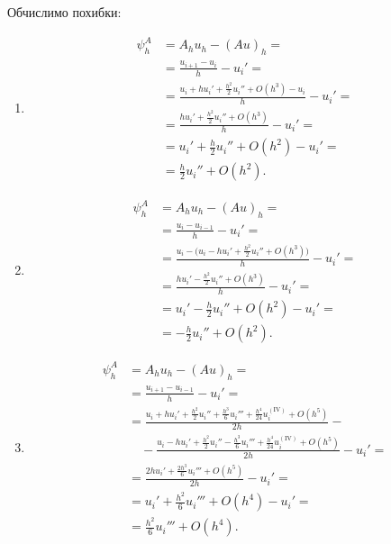 \begin{solution}
    Обчислимо похибки:
    \begin{enumerate}
        \item
        \begin{equation*}
            \begin{aligned}
                \psi_h^A &= A_h u_h - (A u)_h = \\
                &= \frac{u_{i + 1} - u_i}{h} - u_i' = \\
                &= \frac{u_i + h u_i' + \frac{h^2}{2} u_i'' + O(h^3) - u_i}{h} - u_i' = \\
                &= \frac{h u_i' + \frac{h^2}{2} u_i'' + O(h^3)}{h} - u_i' = \\
                &= u_i' + \frac{h}{2} u_i'' + O(h^2) - u_i' = \\
                &= \frac{h}{2} u_i'' + O(h^2).
            \end{aligned}
        \end{equation*}

        \item 
        \begin{equation*}
            \begin{aligned}
                \psi_h^A &= A_h u_h - (A u)_h = \\
                &= \frac{u_i - u_{i - 1}}{h} - u_i' = \\
                &= \frac{u_i - \Big( u_i - h u_i' + \frac{h^2}{2} u_i'' + O(h^3)\Big)}{h} - u_i' = \\
                &= \frac{h u_i' - \frac{h^2}{2} u_i'' + O(h^3)}{h} - u_i' = \\
                &= u_i' - \frac{h}{2} u_i'' + O(h^2) - u_i' = \\
                &= - \frac{h}{2} u_i'' + O(h^2).
            \end{aligned}
        \end{equation*}

        \item 
        \begin{equation}
            \label{eq:4.3.5}
            \begin{aligned}
                \psi_h^A &= A_h u_h - (A u)_h = \\
                &= \frac{u_{i + 1} - u_{i - 1}}{h} - u_i' = \\
                &= \frac{u_i + h u_i' + \frac{h^2}{2} u_i'' + \frac{h^3}{6} u_i''' + \frac{h^4}{24} u_i^{(\text{IV})} + O(h^5)}{2h} - \\
                &\quad - \frac{u_i - h u_i' + \frac{h^2}{2} u_i'' - \frac{h^3}{6} u_i''' + \frac{h^4}{24} u_i^{(\text{IV})} + O(h^5)}{2h} - u_i' = \\
                &= \frac{2 h u_i' + \frac{2 h^3}{6} u_i''' + O(h^5)}{2h} - u_i' = \\
                &= u_i' + \frac{h^2}{6} u_i''' + O(h^4) - u_i' = \\
                &= \frac{h^2}{6} u_i''' + O(h^4).
            \end{aligned}
        \end{equation}


\end{enumerate}
\end{solution}
